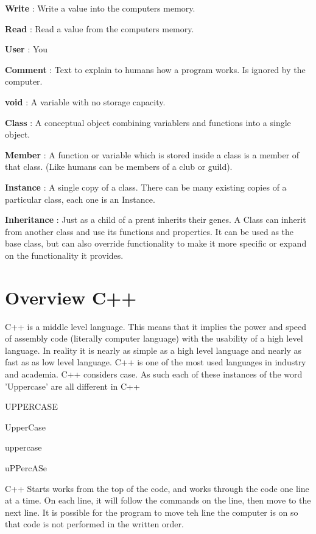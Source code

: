 \begin{DoxyItemize}
\item {\bfseries Write} : Write a value into the computers memory.
\item {\bfseries Read} : Read a value from the computers memory.
\item {\bfseries User} : You
\item {\bfseries Comment} : Text to explain to humans how a program works. Is ignored by the computer.
\item {\bfseries void} : A variable with no storage capacity.
\item {\bfseries Class} : A conceptual object combining variablers and functions into a single object.
\item {\bfseries Member} : A function or variable which is stored inside a class is a member of that class. (Like humans can be members of a club or guild).
\item {\bfseries Instance} : A single copy of a class. There can be many existing copies of a particular class, each one is an Instance.
\item {\bfseries Inheritance} : Just as a child of a prent inherits their genes. A Class can inherit from another class and use its functions and properties. It can be used as the base class, but can also override functionality to make it more specific or expand on the functionality it provides.
\end{DoxyItemize}\hypertarget{_programming_basics_BasicsPageStructure}{}\section{Overview C++}\label{_programming_basics_BasicsPageStructure}
C++ is a middle level language. This means that it implies the power and speed of assembly code (literally computer language) with the usability of a high level language. In reality it is nearly as simple as a high level language and nearly as fast as as low level language. C++ is one of the most used languages in industry and academia. C++ considers case. As such each of these instances of the word 'Uppercase' are all different in C++
\begin{DoxyItemize}
\item UPPERCASE
\item UpperCase
\item uppercase
\item uPPercASe
\end{DoxyItemize}C++ Starts works from the top of the code, and works through the code one line at a time. On each line, it will follow the commands on the line, then move to the next line. It is possible for the program to move teh line the computer is on so that code is not performed in the written order. \par
